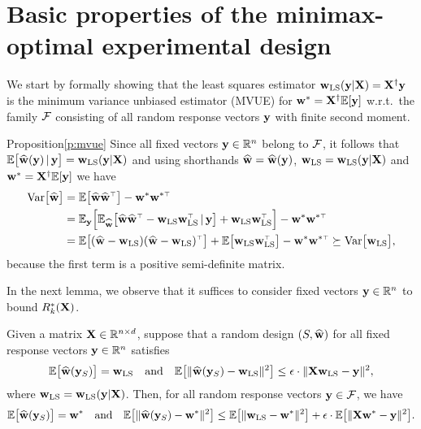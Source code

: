 \documentclass[12pt]{sty/colt2019/colt2018-arxiv}
\begin{document}
\section{Basic properties of the minimax-optimal experimental design}
\label{a:minimax}
We start by formally showing that
the least squares estimator $\mathbf w_{\mathrm{LS}}(\mathbf y|\mathbf X)=\mathbf X^\dagger\mathbf y$ is 
the minimum variance unbiased estimator (MVUE) for
$\mathbf w^*=\mathbf X^\dagger\mathbb E[\mathbf y]$ w.r.t.~the family $\mathcal{F}$ consisting of all
random response vectors $\mathbf y$ with finite second moment.
\begin{proofof}{Proposition}{\ref{p:mvue}}
  Since all fixed vectors $\mathbf y\in\mathbb R^n$ belong to $\mathcal{F}$, it follows
  that $\mathbb E\big[\widehat{\mathbf w}(\mathbf y)\,|\,\mathbf y\big] = \mathbf w_{\mathrm{LS}}(\mathbf y|\mathbf X)$ and using
  shorthands $\widehat{\mathbf w}=\widehat{\mathbf w}(\mathbf y)$, $\mathbf w_{\mathrm{LS}}=\mathbf w_{\mathrm{LS}}(\mathbf y|\mathbf X)$ and
  $\mathbf w^*=\mathbf X^\dagger\mathbb E[\mathbf y]$ we have
  \begin{align*}
    \Var\big[\wbh\big]
    &= \E\big[\wbh\wbh^\top\big] - \w^*\w^{*\top}\\
    &=\E_\y \Big[\E_{\wbh}\big[\wbh\wbh^\top-\wols\wols^\top\,|\,\y\big]
      +\wols\wols^\top\Big] - \w^*\w^{*\top}\\
    &=\E\big[(\wbh-\wols)(\wbh-\wols)^\top\big] +
      \E\big[\wols\wols^\top\big] - \w^*\w^{*\top}\succeq \Var\big[\wols\big],
  \end{align*}
  because the first term is a positive semi-definite matrix.
\end{proofof}
In the next lemma, we observe that it suffices to consider fixed
vectors $\mathbf y\in\mathbb R^n$ to bound $R_k^*(\mathbf X)$.
\begin{lemma}\label{l:fixed}
  Given a matrix $\mathbf X\in\mathbb R^{n\times d}$, suppose that a random design
  $(S,\widehat{\mathbf w})$ for all fixed response vectors $\mathbf y\in\mathbb R^n$ satisfies 
  \begin{align*}
    \mathbb E\big[\widehat{\mathbf w}(\mathbf y_S)\big]=\mathbf w_{\mathrm{LS}}\quad\text{and}\quad
    \mathbb E\big[\|\widehat{\mathbf w}(\mathbf y_S)-\mathbf w_{\mathrm{LS}}\|^2\big]\leq
    \epsilon\cdot\|\mathbf X\mathbf w_{\mathrm{LS}}-\mathbf y\|^2,
  \end{align*}
where $\mathbf w_{\mathrm{LS}}=\mathbf w_{\mathrm{LS}}(\mathbf y|\mathbf X)$. Then, for all random response vectors
$\mathbf y\in \mathcal{F}$, we have
  \begin{align*}
    \mathbb E\big[\widehat{\mathbf w}(\mathbf y_S)\big] = \mathbf w^*\quad\text{and}\quad
    \mathbb E\big[\|\widehat{\mathbf w}(\mathbf y_S)-\mathbf w^*\|^2\big]\leq \mathbb E\big[\|\mathbf w_{\mathrm{LS}}-\mathbf w^*\|^2\big]+ \epsilon\cdot \mathbb E\big[\|\mathbf X\mathbf w^*-\mathbf y\|^2\big].
  \end{align*}
\end{lemma}
\end{document}
